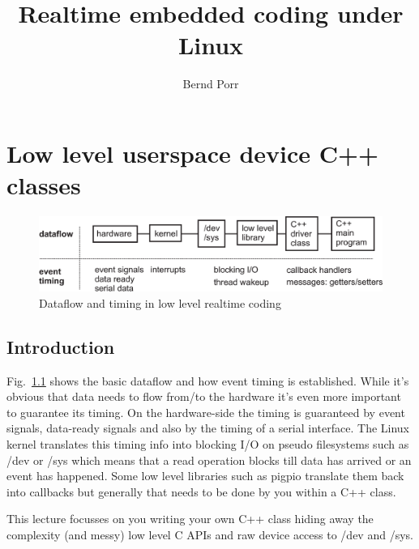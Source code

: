 \documentclass[12pt]{report}
\author{Bernd Porr}
\title{Realtime embedded coding under Linux}
\begin{document}
\maketitle

\tableofcontents

\chapter{Low level userspace device C++ classes}

\begin{figure}[!hbt]
\begin{center}
\mbox{\includegraphics[width=\textwidth]{signals-timings}}
\end{center}
\caption{Dataflow and timing in low level realtime coding
\label{timing}}
\end{figure}

\section{Introduction}
Fig.~\ref{timing} shows the basic dataflow and how event timing
is established. While it's obvious that data needs to flow
from/to the hardware it's even more important to guarantee
its timing. On the hardware-side the timing is guaranteed
by event signals, data-ready signals and also by the timing
of a serial interface. The Linux kernel translates this
timing info into blocking I/O on pseudo filesystems such as /dev or /sys
which means that a read
operation blocks till data has arrived or an event has
happened. Some low level libraries such as pigpio
translate them back into callbacks but generally that
needs to be done by you within a C++ class.

This lecture focusses on you writing your own C++ class hiding away
the complexity (and messy) low level C APIs and raw device
access to /dev and /sys.
\end{document}
